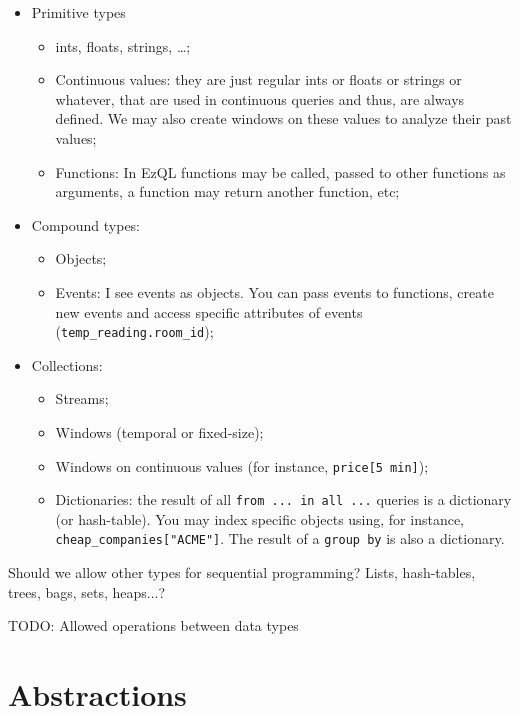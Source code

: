\documentclass{report}
\begin{document}
\begin{itemize}
\item Primitive types
  \begin{itemize}
  \item ints, floats, strings, \ldots;
  \item Continuous values: they are just regular ints or floats or
    strings or whatever, that are used in continuous queries and thus,
    are always defined. We may also create windows on these values to
    analyze their past values;
  \item Functions: In EzQL functions may be called, passed to other
    functions as arguments, a function may return another function,
    etc;
  \end{itemize}
\item Compound types:
  \begin{itemize}
  \item Objects;
  \item Events: I see events as objects. You can pass events to
    functions, create new events and access specific attributes of
    events (\verb=temp_reading.room_id=);
  \end{itemize}
\item Collections:
  \begin{itemize}
  \item Streams;
  \item Windows (temporal or fixed-size);
  \item Windows on continuous values (for instance,
    \verb=price[5 min]=);
  \item Dictionaries: the result of all \verb=from ... in all ...=
    queries is a dictionary (or hash-table). You may index specific
    objects using, for instance, \verb=cheap_companies["ACME"]=. The
    result of a \verb=group by= is also a dictionary.
  \end{itemize}
\end{itemize}

Should we allow other types for sequential programming? Lists,
hash-tables, trees, bags, sets, heaps...?

TODO: Allowed operations between data types

\chapter{Abstractions}
\end{document}
